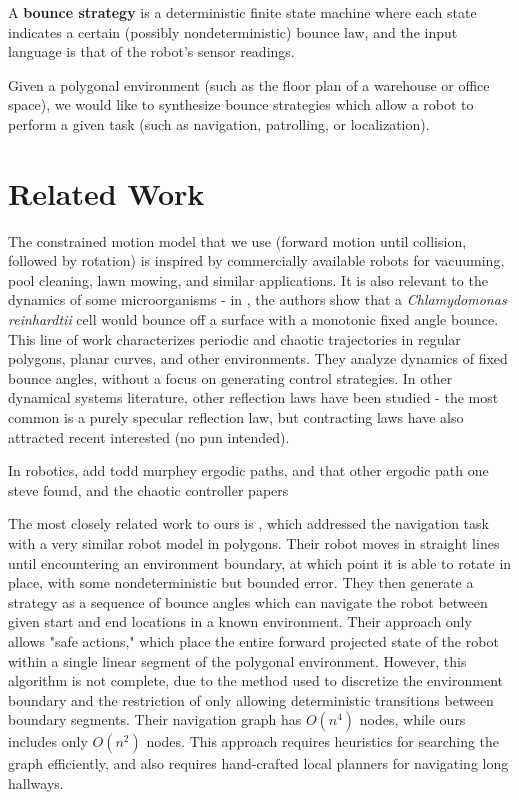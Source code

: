\documentclass[]{styles/svproc}  %
\begin{document}
\begin{definition}
A \textbf{bounce strategy} is a deterministic finite state machine where each
state indicates a certain (possibly nondeterministic) bounce law, and the input language is that of the
robot's sensor readings.
\end{definition}

Given a polygonal environment (such as the floor plan of a warehouse or office
space), we would like to synthesize bounce strategies which allow a robot to
perform a given task (such as navigation, patrolling, or localization).

\section{Related Work}

The constrained motion model that we use (forward motion until collision,
followed by rotation) is inspired by commercially available robots
for vacuuming, pool cleaning, lawn mowing, and similar applications. It is also
 relevant to the dynamics of some microorganisms - in \cite{microorganism2017}, the authors show that a
\textit{Chlamydomonas reinhardtii} cell would bounce off a surface with a
monotonic fixed angle bounce. This line of work characterizes periodic and
chaotic trajectories in regular polygons, planar curves, and other environments.
They analyze dynamics of fixed bounce angles, without a focus on generating control
strategies. In other dynamical systems literature, other reflection laws have been studied -
the most common is a purely specular reflection law, but contracting laws have
also attracted recent interested \cite{DelMagno2014,billiards,pinball} (no pun intended).


In robotics, 
{\color{red} add todd murphey ergodic paths, and that other ergodic path one steve
found, and the chaotic controller papers}

The most closely related work to ours is \cite{LewOKa13}, which addressed 
the navigation task with a very similar robot
model in polygons. Their robot moves in straight lines until encountering an environment
boundary, at which point it is able to rotate in place, with some nondeterministic but
bounded error. They then generate a strategy as a sequence of bounce angles which can 
navigate the robot between given start and end locations in a known environment. Their approach only allows "safe actions," which place
the entire forward projected state of the robot within a single
linear segment of the polygonal environment. However, this algorithm is
not complete, due to the method used to discretize the environment boundary and
the restriction of only allowing deterministic transitions between boundary
segments. Their navigation graph has $O(n^4)$ nodes, while ours includes only $O(n^2)$
nodes. This approach requires heuristics for searching the graph efficiently,
and also requires hand-crafted local planners for navigating long hallways.
\end{document}
